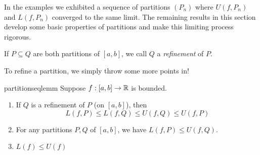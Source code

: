 In the examples we exhibited a sequence of partitions $(P_n)$ where $U(f,P_n)$ and $L(f,P_n)$ converged to the same limit. The remaining results in this section develop some basic properties of partitions and make this limiting process rigorous.

\begin{defn}{}{}
	If $P\subseteq Q$ are both partitions of $[a,b]$, we call $Q$ a \emph{refinement} of $P$.
\end{defn}

To refine a partition, we simply throw some more points in! 

\begin{lemm}{}{partitionseqlemm}
	Suppose $f:[a,b]\to\mathbb{R}$ is bounded.
	\begin{enumerate}\itemsep2pt
	  \item If $Q$ is a refinement of $P$ (on $[a,b]$), then
	  \[
	  	L(f,P)\le L(f,Q)\le U(f,Q)\le U(f,P)
	  \]
	  \item For any partitions $P,Q$ of $[a,b]$, we have $L(f,P)\le U(f,Q)$.
	  \item $L(f)\le U(f)$
	\end{enumerate} 
\end{lemm}

\goodbreak

